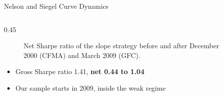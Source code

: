 \documentclass[10pt, aspectratio=169]{beamer}
\newcommand{\key}[1]{\textcolor{accent}{\textbf{#1}}}
\begin{document}
\begin{frame}{Nelson and Siegel Curve Dynamics}
\begin{columns}[T, onlytextwidth]
\begin{column}{0.45\textwidth}
\begin{figure}
\caption{Net Sharpe ratio of the slope strategy before and after December 2000 (CFMA) and March 2009 (GFC).}
\end{figure}
\vspace{-1ex}
\begin{itemize}\footnotesize
  \item Gross Sharpe ratio 1.41, \key{net 0.44 to 1.04}
  \item Our sample starts in 2009, inside the weak regime
\end{itemize}
\end{column}
\end{columns}
\end{frame}
\end{document}
